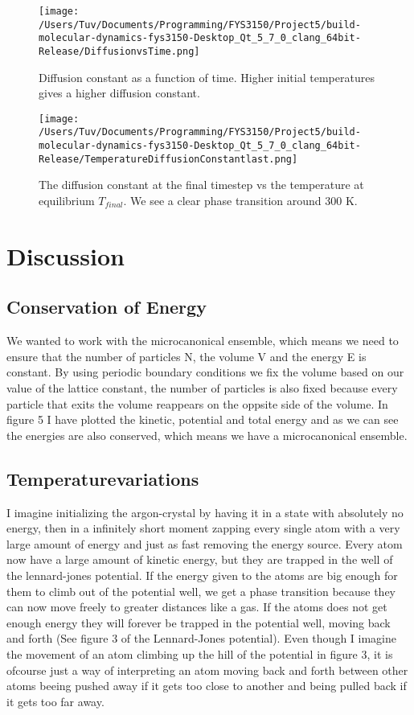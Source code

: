 \documentclass[a4paper, 12pt]{article}
\begin{document}
\begin{figure}[H]
\centering
\texttt{[image: /Users/Tuv/Documents/Programming/FYS3150/Project5/build-molecular-dynamics-fys3150-Desktop\_Qt\_5\_7\_0\_clang\_64bit-Release/DiffusionvsTime.png]}
\caption{Diffusion constant as a function of time. Higher initial temperatures gives a higher diffusion constant. }
\end{figure}

\begin{figure}[H]
\texttt{[image: /Users/Tuv/Documents/Programming/FYS3150/Project5/build-molecular-dynamics-fys3150-Desktop\_Qt\_5\_7\_0\_clang\_64bit-Release/TemperatureDiffusionConstantlast.png]}
\caption{The diffusion constant at the final timestep vs the temperature at equilibrium $T_{final}$. We see a clear phase transition around 300 K.}
\end{figure}
\newpage
\section{Discussion}
\subsection{Conservation of Energy}
We wanted to work with the microcanonical ensemble, which means we need to ensure that the number of particles N, the volume V and the energy E is constant. By using periodic boundary conditions we fix the volume based on our value of the lattice constant, the number of particles is also fixed because every particle that exits the volume reappears on the oppsite side of the volume. In figure 5 I have plotted the kinetic, potential and total energy and as we can see the energies are also conserved, which means we have a microcanonical ensemble.
\subsection{Temperaturevariations}

I imagine initializing the argon-crystal by having it in a state with absolutely no energy, then in a infinitely short moment zapping every single atom with a very large amount of energy and just as fast removing the energy source. Every atom now have a large amount of kinetic energy, but they are trapped in the well of the lennard-jones potential. If the energy given to the atoms are big enough for them to climb out of the potential well, we get a phase transition because they can now move freely to greater distances like a gas. If the atoms does not get enough energy they will forever be trapped in the potential well, moving back and forth (See figure 3 of the Lennard-Jones potential). Even though I imagine the movement of an atom climbing up the hill of the potential in figure 3, it is ofcourse just a way of interpreting an atom moving back and forth between other atoms beeing pushed away if it gets too close to another and being pulled back if it gets too far away.\\
\end{document}
